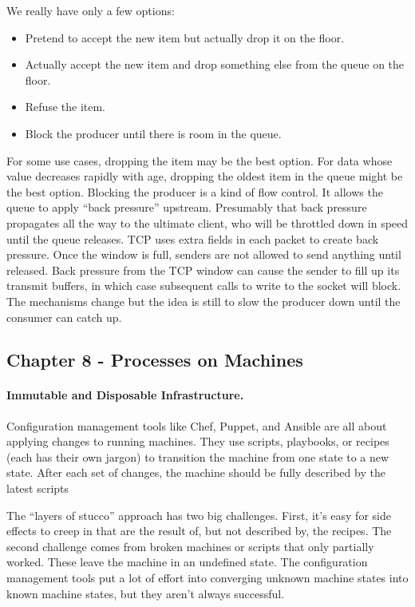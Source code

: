 We really have only a few options:
\begin{itemize}

\item Pretend to accept the new item but actually drop it on the floor.
\item Actually accept the new item and drop something else from the queue on the floor.
\item Refuse the item.
\item Block the producer until there is room in the queue.

\end{itemize}

For some use cases, dropping the item may be the best option. For data whose value decreases rapidly with age, dropping the oldest item in the queue might be the best option. Blocking the producer is a kind of flow control. It allows the queue to apply “back pressure” upstream. Presumably that back pressure propagates all the way to the ultimate client, who will be throttled down in speed until the queue releases. TCP uses extra fields in each packet to create back pressure. Once the window is full, senders are not allowed to send anything until released. Back pressure from the TCP window can cause the sender to fill up its transmit buffers, in which case subsequent calls to write to the socket will block. The mechanisms change but the idea is still to slow the producer down until the consumer can catch up.


\subsection{Chapter 8 - Processes on Machines}

\paragraph{Immutable and Disposable Infrastructure.} Configuration management tools like Chef, Puppet, and Ansible are all about applying changes to running machines. They use scripts, playbooks, or recipes (each has their own jargon) to transition the machine from one state to a new state. After each set of changes, the machine should be fully described by the latest scripts

The “layers of stucco” approach has two big challenges. First, it’s easy for side effects to creep in that are the result of, but not described by, the recipes. The second challenge comes from broken machines or scripts that only partially worked. These leave the machine in an undefined state. The configuration management tools put a lot of effort into converging unknown machine states into known machine states, but they aren’t always successful.

